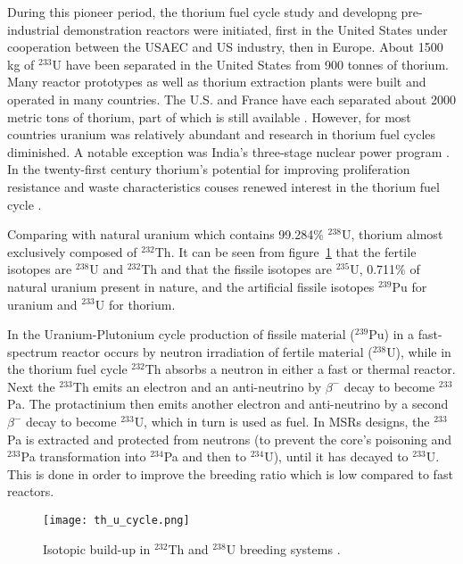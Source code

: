 During this pioneer period, the thorium fuel cycle study and developng pre-industrial demonstration reactors were initiated, first in the United States under cooperation between the USAEC and US industry, then in Europe.
About 1500 kg of $^{233}$U have been separated in the United States from 900 tonnes of thorium. Many reactor prototypes as well as thorium extraction plants were built and operated in many countries. The U.S. and France have each separated about 2000 metric tons of thorium, part of which is still available \cite{lung_perspectives_1998}. However, for most countries uranium was relatively abundant and research in thorium fuel cycles diminished. A notable exception was India's three-stage nuclear power program \cite{natarajan_fast_2007}. In the twenty-first century thorium's potential for improving proliferation resistance and waste characteristics couses renewed interest in the thorium fuel cycle \cite{bagla_thorium_2015}.

Comparing with natural uranium which contains 99.284\% $^{238}$U, thorium almost exclusively composed of $^{232}$Th. It can be seen from figure~\ref{fig:th_cycle} that the fertile isotopes are $^{238}$U and $^{232}$Th and that the fissile isotopes are $^{235}$U, 0.711\% of natural uranium present in nature, and the artificial fissile isotopes $^{239}$Pu for uranium and $^{233}$U for thorium. 

In the Uranium-Plutonium cycle production of fissile material ($^{239}$Pu) in a fast-spectrum reactor occurs by neutron irradiation of fertile material ($^{238}$U), while in the thorium fuel cycle $^{232}$Th absorbs a neutron in either a fast or thermal reactor. Next the $^{233}$Th emits an electron and an anti-neutrino by $\beta^-$ decay to become $^{233}$Pa. The protactinium then emits another electron and anti-neutrino by a second $\beta^-$ decay to become $^{233}$U, which in turn is used as fuel. In \glspl{MSR} designs, the $^{233}$Pa is extracted and protected from neutrons (to prevent the core's poisoning and $^{233}$Pa transformation into $^{234}$Pa and then to $^{234}$U), until it has decayed to $^{233}$U. This is done in order to improve the breeding ratio which is low compared to fast reactors. 

\begin{figure}[t] %
  \centering
  \vspace{-0.3em}
  \texttt{[image: th\_u\_cycle.png]}
  \caption{Isotopic build-up in $^{232}$Th and $^{238}$U breeding systems \cite{eschbach_possible_1966}.}
  \vspace{-0.6em}
  \label{fig:th_cycle}
\end{figure}
\FloatBarrier

